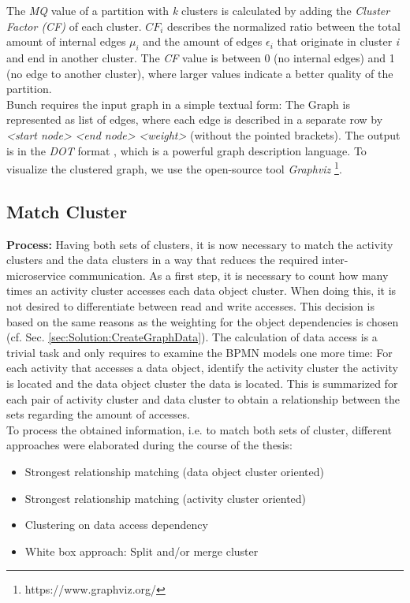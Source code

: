 \noindent
The \textit{MQ} value of a partition with \textit{k} clusters is calculated by adding the \textit{Cluster Factor (CF)} of each cluster. $CF_{i}$ describes the normalized ratio between the total amount of internal edges $\mu_{i}$ and the amount of edges $\epsilon_{i}$ that originate in cluster \textit{i} and end in another cluster. The \textit{CF} value is between 0 (no internal edges) and 1 (no edge to another cluster), where larger values indicate a better quality of the partition. \\
Bunch requires the input graph in a simple textual form: The Graph is represented as list of edges, where each edge is described in a separate row by \textit{<start node>} \textit{<end node>} \textit{<weight>} (without the pointed brackets). The output is in the \textit{DOT} format \cite{DOT}, which is a powerful graph description language. To visualize the clustered graph, we use the open-source tool \textit{Graphviz} \footnote{https://www.graphviz.org/}.




\subsection{Match Cluster}
\label{sec:Solution:MatchCluster}
\textbf{Process:} Having both sets of clusters, it is now necessary to match the activity clusters and the data clusters in a way that reduces the required inter-microservice communication. As a first step, it is necessary to count how many times an activity cluster accesses each data object cluster. When doing this, it is not desired to differentiate between read and write accesses. This decision is based on the same reasons as the weighting for the object dependencies is chosen (cf. Sec. \ref{sec:Solution:CreateGraphData}). The calculation of data access is a trivial task and only requires to examine the BPMN models one more time: For each activity that accesses a data object, identify the activity cluster the activity is located and the data object cluster the data is located. This is summarized for each pair of activity cluster and data cluster to obtain a relationship between the sets regarding the amount of accesses.\\
To process the obtained information, i.e. to match both sets of cluster, different approaches were elaborated during the course of the thesis:

\begin{itemize}
	\item Strongest relationship matching (data object cluster oriented)
	\item Strongest relationship matching (activity cluster oriented)
	\item Clustering on data access dependency
	\item White box approach: Split and/or merge cluster
\end{itemize}

